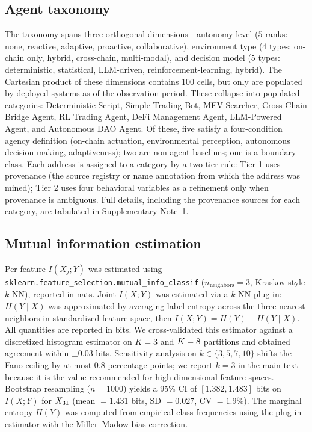 \documentclass[11pt,a4paper]{article}
\begin{document}
\subsection*{Agent taxonomy}

The taxonomy spans three orthogonal dimensions---autonomy level
($5$ ranks: none, reactive, adaptive, proactive, collaborative),
environment type ($4$ types: on-chain only, hybrid, cross-chain,
multi-modal), and decision model ($5$ types: deterministic, statistical,
LLM-driven, reinforcement-learning, hybrid). The Cartesian product of
these dimensions contains $100$ cells, but only \nClasses{} are populated by
deployed systems as of the observation period. These collapse into \nClasses{}
populated categories: Deterministic Script, Simple Trading Bot, MEV
Searcher, Cross-Chain Bridge Agent, RL Trading Agent, DeFi Management
Agent, LLM-Powered Agent, and Autonomous DAO Agent. Of these, five
satisfy a four-condition agency definition (on-chain actuation,
environmental perception, autonomous decision-making, adaptiveness);
two are non-agent baselines; one is a boundary class. Each address is
assigned to a category by a two-tier rule: Tier 1 uses provenance (the
source registry or name annotation from which the address was mined);
Tier 2 uses four behavioral variables as a refinement only when
provenance is ambiguous. Full details, including the provenance sources
for each category, are tabulated in Supplementary Note~1.

\subsection*{Mutual information estimation}

Per-feature $I(X_j; Y)$ was estimated using
\texttt{sklearn.feature\_selection.mutual\_info\_classif}
($n_{\text{neighbors}} = 3$, Kraskov-style
$k$-NN\cite{kraskov2004estimating}), reported in nats. Joint $I(X;Y)$
was estimated via a $k$-NN plug-in: $H(Y \mid X)$ was approximated by
averaging label entropy across the three nearest neighbors in
standardized feature space, then $I(X;Y) = H(Y) - H(Y \mid X)$. All
quantities are reported in bits. We cross-validated this estimator
against a discretized histogram estimator on $K = 3$ and $K = 8$
partitions and obtained agreement within $\pm 0.03$ bits. Sensitivity
analysis on $k \in \{3, 5, 7, 10\}$ shifts the Fano ceiling by at most
$0.8$ percentage points; we report $k = 3$ in the main text because it is
the value recommended for high-dimensional feature
spaces\cite{gao2017estimating}. Bootstrap resampling ($n{=}1000$) yields
a 95\% CI of $[1.382, 1.483]$ bits on $I(X;Y)$ for $X_{31}$
(mean $= 1.431$ bits, SD $= 0.027$, CV $= 1.9\%$). The marginal entropy $H(Y)$ was
computed from empirical class frequencies using the plug-in estimator
with the Miller--Madow bias correction\cite{paninski2003}.
\end{document}
